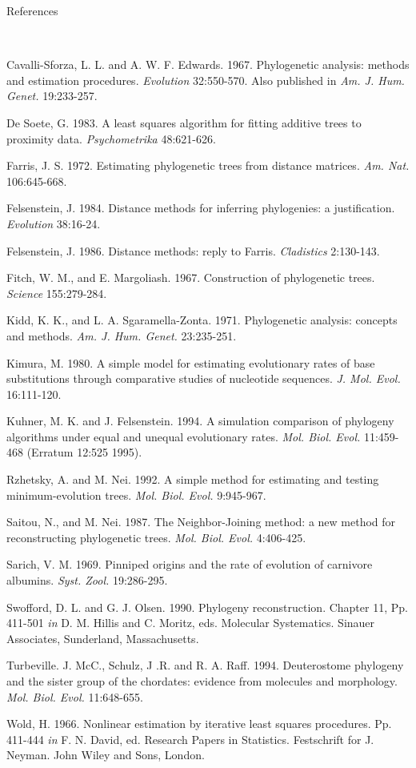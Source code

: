 \documentclass[12pt]{article}
\begin{document}
\newpage

\centerline{\sc References}

{
\parindent=-0.2in

{~~~}

{\sc Cavalli-Sforza, L. L. and A. W. F. Edwards.} 1967. Phylogenetic analysis:
methods and estimation procedures. {\it Evolution} 32:550-570.  Also published
in {\it Am. J. Hum. Genet.} 19:233-257.

{\sc De Soete, G.}  1983.  A least squares algorithm for fitting additive trees
to proximity data. {\it Psychometrika} 48:621-626.

{\sc Farris, J. S.} 1972. Estimating phylogenetic trees from distance matrices.
{\it Am. Nat.}  106:645-668.

{\sc Felsenstein, J.} 1984. Distance methods for inferring phylogenies: a 
justification. {\it Evolution} 38:16-24.

{\sc Felsenstein, J.} 1986.  Distance methods: reply to Farris. {\it Cladistics}
2:130-143.

{\sc Fitch, W. M., and E. Margoliash.} 1967.  Construction of phylogenetic trees.
{\it Science} 155:279-284.

{\sc Kidd, K. K., and L. A. Sgaramella-Zonta.}  1971.  Phylogenetic analysis:
concepts and methods. {\it Am. J. Hum. Genet.}  23:235-251.

{\sc Kimura, M.}  1980.  A simple model for estimating evolutionary rates of base
substitutions through comparative studies of nucleotide sequences.
{\it J. Mol. Evol.} 16:111-120.

{\sc Kuhner, M. K. and J. Felsenstein.}  1994. A simulation comparison of phylogeny
algorithms under equal and unequal evolutionary rates.  {\it Mol. Biol.
Evol.}   11:459-468 (Erratum  12:525  1995).


{\sc Rzhetsky, A. and M. Nei.}  1992.  A simple method for estimating and
testing minimum-evolution trees.  {\it Mol. Biol. Evol.}  9:945-967.

{\sc Saitou, N., and M. Nei.}  1987.  The Neighbor-Joining method: a new method for
reconstructing phylogenetic trees.  {\it Mol. Biol. Evol.} 4:406-425.

{\sc Sarich, V. M.} 1969.  Pinniped origins and the rate of evolution of
carnivore albumins.  {\it Syst. Zool.} 19:286-295.

{\sc Swofford, D. L. and G. J. Olsen.}  1990.  Phylogeny reconstruction.
Chapter 11,
Pp. 411-501 {\it in} {\sc D. M. Hillis} and {\sc C. Moritz}, eds.
Molecular Systematics. Sinauer Associates, Sunderland, Massachusetts.

{\sc Turbeville. J. McC., Schulz, J .R. and R. A. Raff}.  1994.
Deuterostome phylogeny and the sister group of the chordates: evidence from
molecules and morphology.  {\it Mol. Biol. Evol.} 11:648-655. 

{\sc Wold, H.}  1966.  Nonlinear estimation by iterative least
squares procedures.  Pp. 411-444 {\it in} {\sc F. N. David}, ed.
Research Papers in Statistics.  Festschrift for J. Neyman.  John Wiley and
Sons, London.

}
\newpage
\end{document}
